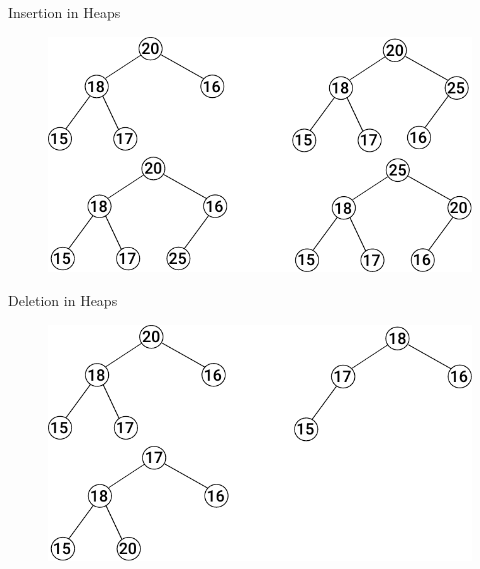 \documentclass[aspectratio=169,8pt]{beamer}
\begin{document}
\begin{frame}{Insertion in Heaps}
  \begin{center}
    \begin{figure}
      \includegraphics{heap2}
    \end{figure}
  \end{center}
\end{frame}
\begin{frame}{Deletion in Heaps}
  \begin{center}
    \begin{figure}
      \includegraphics{heap3}
    \end{figure}
  \end{center}
\end{frame}
\end{document}

